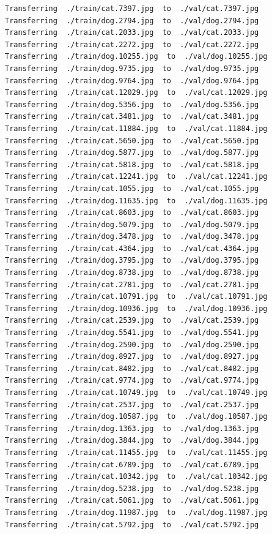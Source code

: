 \documentclass[]{book}
\theoremstyle{definition}
\theoremstyle{definition}
\theoremstyle{definition}
\theoremstyle{remark}
\begin{document}
\begin{verbatim}
Transferring  ./train/cat.7397.jpg  to  ./val/cat.7397.jpg
Transferring  ./train/dog.2794.jpg  to  ./val/dog.2794.jpg
Transferring  ./train/cat.2033.jpg  to  ./val/cat.2033.jpg
Transferring  ./train/cat.2272.jpg  to  ./val/cat.2272.jpg
Transferring  ./train/dog.10255.jpg  to  ./val/dog.10255.jpg
Transferring  ./train/dog.9735.jpg  to  ./val/dog.9735.jpg
Transferring  ./train/dog.9764.jpg  to  ./val/dog.9764.jpg
Transferring  ./train/cat.12029.jpg  to  ./val/cat.12029.jpg
Transferring  ./train/dog.5356.jpg  to  ./val/dog.5356.jpg
Transferring  ./train/cat.3481.jpg  to  ./val/cat.3481.jpg
Transferring  ./train/cat.11884.jpg  to  ./val/cat.11884.jpg
Transferring  ./train/cat.5650.jpg  to  ./val/cat.5650.jpg
Transferring  ./train/dog.5877.jpg  to  ./val/dog.5877.jpg
Transferring  ./train/cat.5818.jpg  to  ./val/cat.5818.jpg
Transferring  ./train/cat.12241.jpg  to  ./val/cat.12241.jpg
Transferring  ./train/cat.1055.jpg  to  ./val/cat.1055.jpg
Transferring  ./train/dog.11635.jpg  to  ./val/dog.11635.jpg
Transferring  ./train/cat.8603.jpg  to  ./val/cat.8603.jpg
Transferring  ./train/dog.5079.jpg  to  ./val/dog.5079.jpg
Transferring  ./train/dog.3478.jpg  to  ./val/dog.3478.jpg
Transferring  ./train/cat.4364.jpg  to  ./val/cat.4364.jpg
Transferring  ./train/dog.3795.jpg  to  ./val/dog.3795.jpg
Transferring  ./train/dog.8738.jpg  to  ./val/dog.8738.jpg
Transferring  ./train/cat.2781.jpg  to  ./val/cat.2781.jpg
Transferring  ./train/cat.10791.jpg  to  ./val/cat.10791.jpg
Transferring  ./train/dog.10936.jpg  to  ./val/dog.10936.jpg
Transferring  ./train/cat.2539.jpg  to  ./val/cat.2539.jpg
Transferring  ./train/dog.5541.jpg  to  ./val/dog.5541.jpg
Transferring  ./train/dog.2590.jpg  to  ./val/dog.2590.jpg
Transferring  ./train/dog.8927.jpg  to  ./val/dog.8927.jpg
Transferring  ./train/cat.8482.jpg  to  ./val/cat.8482.jpg
Transferring  ./train/cat.9774.jpg  to  ./val/cat.9774.jpg
Transferring  ./train/cat.10749.jpg  to  ./val/cat.10749.jpg
Transferring  ./train/cat.2537.jpg  to  ./val/cat.2537.jpg
Transferring  ./train/dog.10587.jpg  to  ./val/dog.10587.jpg
Transferring  ./train/dog.1363.jpg  to  ./val/dog.1363.jpg
Transferring  ./train/dog.3844.jpg  to  ./val/dog.3844.jpg
Transferring  ./train/cat.11455.jpg  to  ./val/cat.11455.jpg
Transferring  ./train/cat.6789.jpg  to  ./val/cat.6789.jpg
Transferring  ./train/cat.10342.jpg  to  ./val/cat.10342.jpg
Transferring  ./train/dog.5238.jpg  to  ./val/dog.5238.jpg
Transferring  ./train/cat.5061.jpg  to  ./val/cat.5061.jpg
Transferring  ./train/dog.11987.jpg  to  ./val/dog.11987.jpg
Transferring  ./train/cat.5792.jpg  to  ./val/cat.5792.jpg

\end{verbatim}
\end{document}
